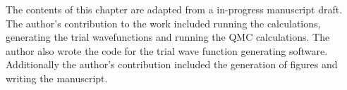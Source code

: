 The contents of this chapter are adapted from a in-progress manuscript draft.
The author's contribution to the work included running the calculations, generating the trial wavefunctions and running the QMC calculations. 
The author also wrote the code for the trial wave function generating software.
Additionally the author's contribution included the generation of figures and writing the manuscript.
